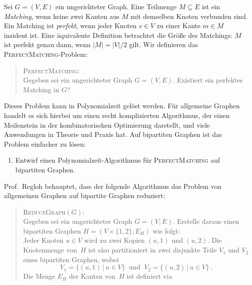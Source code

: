 \documentclass{uebung_cs}
\begin{document}
\begin{exercise}[Perfektes Matching]
	Sei $G = (V,E)$ ein ungerichteter Graph. Eine Teilmenge $M \subseteq E$ ist ein \textit{Matching}, wenn keine zwei Kanten aus $M$ mit demselben Knoten verbunden sind. Ein Matching ist \textit{perfekt}, wenn jeder Knoten $v \in V$ zu einer Kante $m \in M$ inzident ist. Eine äquivalente Definition betrachtet die Größe des Matchings: $M$ ist perfekt genau dann, wenn $|M| = |V|/2$ gilt. Wir definieren das \textsc{PerfectMatching}-Problem:
	\begin{quote}
		\textsc{PerfectMatching}:\\
		Gegeben sei ein ungerichteter Graph $G = (V,E)$. Existiert ein perfektes Matching in $G$?
	\end{quote}
	Dieses Problem kann in Polynomialzeit gelöst werden. Für allgemeine Graphen handelt es sich hierbei um einen recht komplizierten Algorithmus, der einen Meilenstein in der kombinatorischen Optimierung darstellt, und viele Anwendungen in Theorie und Praxis hat.
	Auf bipartiten Graphen ist das Problem einfacher zu lösen:
	\begin{enumerate}
		\item\medium Entwirf einen Polynomialzeit-Algorithmus für \textsc{PerfectMatching} auf bipartiten Graphen.\\
	\end{enumerate}
	Prof.\ Regloh behauptet, dass der folgende Algorithmus das Problem von allgemeinen Graphen auf bipartite Graphen reduziert:
	\begin{quote}
		\textsc{ReduceGraph}$(G)$:\\
		Gegeben sei ein ungerichteter Graph $G = (V,E)$. Erstelle daraus einen bipartiten Graphen $H = (V \times \{1,2\},E_H)$ wie folgt:\\
		Jeder Knoten $u \in V$ wird zu zwei Kopien $(u,1)$ und $(u,2)$. Die Knotenmenge von~$H$ ist also partitioniert in zwei disjunkte Teile $V_1$ und $V_2$ eines bipartiten Graphen, wobei
		\begin{equation*}
			V_1 = \{(u,1)\,|\,u\in V\}\ \text{ und }\ V_2 = \{(u,2)\,|\,u\in V\}\,.
		\end{equation*}
		Die Menge $E_H$ der Kanten von~$H$ ist definiert via

\end{quote}
\end{exercise}
\end{document}
